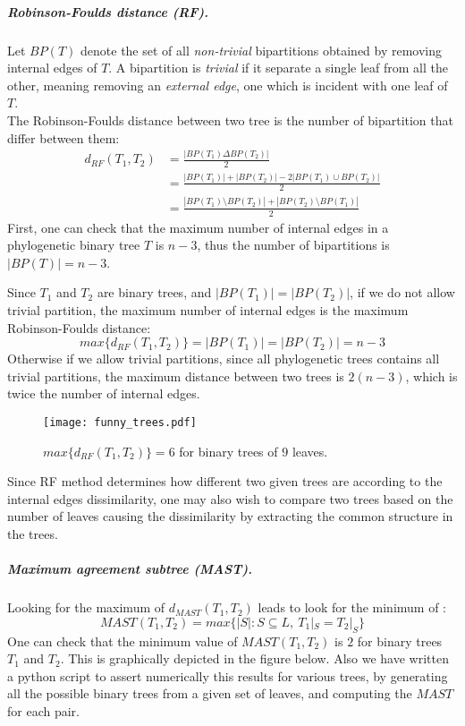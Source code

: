 \documentclass{article}
\begin{document}
\subparagraph{Robinson-Foulds distance (RF).}
Let $BP(T)$ denote the set of all \textit{non-trivial} bipartitions obtained by removing internal edges of $T$. A bipartition is \textit{trivial} if it separate a single leaf from all the other, meaning removing an \textit{external edge}, one which is incident with one leaf of $T$.\\
The Robinson-Foulds distance between two tree is the number of bipartition that differ between them:
\begin{align*}
	d_{RF} (T_1, T_2) &= \frac{| BP(T_1)\Delta BP(T_2) |}{2}\\
								  &= \frac{| BP(T_1)| + | BP(T_2)| - 2| BP(T_1)\cup BP(T_2)|}{2}\\
								  &= \frac{| BP(T_1) \setminus BP(T_2)| + | BP(T_2) \setminus BP(T_1)| }{2}
\end{align*}
First, one can check that the maximum number of internal edges in a phylogenetic binary tree $T$ is $n-3$, thus the number of bipartitions is $|BP(T)| = n - 3$. 

Since $T_1 $ and $ T_2 $ are binary trees, and $|BP(T_1)| = |BP(T_2)|$, if we do not allow trivial partition, the maximum number of internal edges is the maximum Robinson-Foulds distance: $$max\{ d_{RF} (T_1, T_2) \}= |BP(T_1)| = |BP(T_2)| = n - 3$$ 
Otherwise if we allow trivial partitions, since all phylogenetic trees contains all trivial partitions, the maximum distance between two trees is $2(n-3)$, which is twice the number of internal edges. 

\begin{figure}[h!]
\centering
\texttt{[image: funny\_trees.pdf]}
\caption{ $max\{ d_{RF} (T_1, T_2) \} = 6$ for binary trees of $9$ leaves.}
\end{figure}

Since RF method determines how different two given trees are according to the internal edges dissimilarity, one may also wish to compare two trees based on the number of leaves causing the dissimilarity by extracting the common structure in the trees. 

\subparagraph{Maximum agreement subtree (MAST).}

Looking for the maximum of $d_{MAST} (T_1, T_2)$ leads to look for the minimum of : $${MAST} (T_1, T_2) = max\{ |S| : S \subseteq L,~T_1|_{S} = T_2|_{S} \}$$
One can check that the minimum value of $MAST (T_1, T_2)$ is $2$ for binary trees $T_1$ and $T_2$. This is graphically depicted in the figure below. Also we have written a python script to assert numerically this results for various trees, by generating all the possible binary trees from a given set of leaves, and computing the $MAST$ for each pair.
\end{document}
